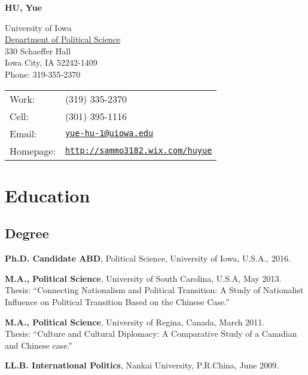 \documentclass[letterpaper]{article}
\def\name{\textbf{HU, Yue}}
\renewenvironment{itemize}{
  \begin{list}{}{
    \setlength{\leftmargin}{1.5em}
  }
}{
  \end{list}
}
\begin{document}
{\huge \name}


\vspace{0.25in}

\begin{minipage}{0.45\linewidth}
  University of Iowa \\
  \href{http://clas.uiowa.edu/polisci/}{Department of Political Science} \\
  330 Schaeffer Hall \\
  Iowa City, IA 52242-1409\\
  Phone: 319-355-2370
\end{minipage}
\begin{minipage}{0.45\linewidth}
  \begin{tabular}{ll}
    Work: & (319) 335-2370 \\
    Cell: &  (301) 395-1116 \\
    Email: & \href{mailto:yue-hu-1@uiowa.edu}{\tt yue-hu-1@uiowa.edu} \\
    Homepage: & \href{http://sammo3182.wix.com/huyue}{\tt http://sammo3182.wix.com/huyue} \\
  \end{tabular}
\end{minipage}

\noindent

\section*{\textbf{Education}}
\subsection*{Degree}
\begin{itemize}
  \item \textbf{Ph.D. Candidate ABD}, Political Science, University of Iowa, U.S.A., 2016.

  \item  \textbf{M.A., Political Science}, University of South Carolina, U.S.A, May 2013.\\ Thesis: ``Connecting Nationalism and Political Transition: A Study of Nationalist Influence on Political Transition Based on the Chinese Case.''

  \item \textbf{M.A., Political Science}, University of Regina, Canada, March 2011.\\ Thesis: ``Culture and Cultural Diplomacy: A Comparative Study of a Canadian and Chinese case.''

  \item \textbf{LL.B. International Politics}, Nankai University, P.R.China, June 2009.
\end{itemize}
\end{document}

